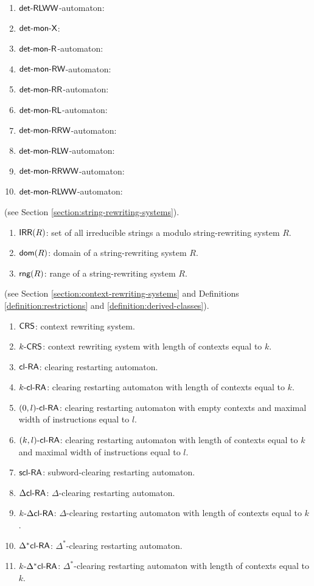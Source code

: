 \begin{enumerate}[]
\item $\textup{\sf det-RLWW}$-automaton: 
\item $\textup{\sf det-mon-X}$: 
\item $\textup{\sf det-mon-R}$-automaton: 
\item $\textup{\sf det-mon-RW}$-automaton: 
\item $\textup{\sf det-mon-RR}$-automaton: 
\item $\textup{\sf det-mon-RL}$-automaton: 
\item $\textup{\sf det-mon-RRW}$-automaton: 
\item $\textup{\sf det-mon-RLW}$-automaton: 
\item $\textup{\sf det-mon-RRWW}$-automaton: 
\item $\textup{\sf det-mon-RLWW}$-automaton: 
\end{enumerate}

 (see Section \ref{section:string-rewriting-systems}).

\begin{enumerate}[]
\item $\textup{\sf IRR}(R)$: set of all irreducible strings a modulo string-rewriting system $R$.
\item $\textup{\sf dom}(R)$: domain of a string-rewriting system $R$.
\item $\textup{\sf rng}(R)$: range of a string-rewriting system $R$.
\end{enumerate}

 (see Section \ref{section:context-rewriting-systems} and Definitions \ref{definition:restrictions} and \ref{definition:derived-classes}).

\begin{enumerate}[]
\item $\textup{\sf CRS\/}$: context rewriting system.
\item $\textup{\sf $k$-\textup{\sf CRS\/}}$: context rewriting system with length of contexts equal to $k$.
\item $\textup{\sf cl-RA\/}$: clearing restarting automaton.
\item $\textup{\sf $k$-\textup{\sf cl-RA\/}}$: clearing restarting automaton with length of contexts equal to $k$.
\item $\textup{\sf $(0,l)$-\textup{\sf cl-RA\/}}$: clearing restarting automaton with empty contexts and maximal width of instructions equal to $l$.
\item $\textup{\sf $(k,l)$-\textup{\sf cl-RA\/}}$: clearing restarting automaton with length of contexts equal to $k$ and maximal width of instructions equal to $l$.
\item $\textup{\sf scl-RA}$: subword-clearing restarting automaton.
\item $\textup{\sf $\Delta$cl-RA\/}$: $\Delta$-clearing restarting automaton.
\item $\textup{\sf $k$-\textup{\sf $\Delta$cl-RA\/}}$: $\Delta$-clearing restarting automaton with length of contexts equal to $k$.
\item $\textup{\sf $\Delta^*$cl-RA\/}$: $\Delta^*$-clearing restarting automaton.
\item $\textup{\sf $k$-\textup{\sf $\Delta^*$cl-RA\/}}$: $\Delta^*$-clearing restarting automaton with length of contexts equal to $k$. 
\end{enumerate}


